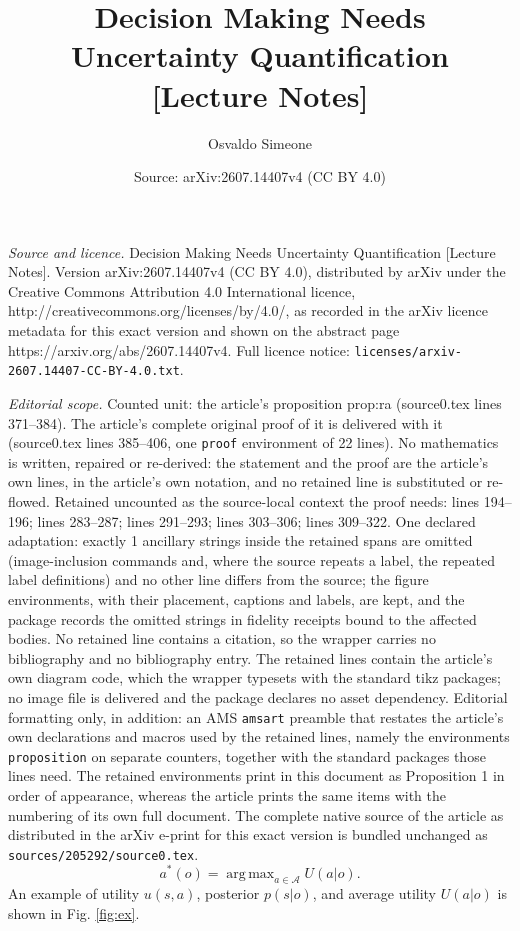 \documentclass[10pt,a4paper]{amsart}
\title{Decision Making Needs Uncertainty Quantification [Lecture Notes]}
\author{Osvaldo Simeone}
\date{Source: arXiv:2607.14407v4 (CC BY 4.0)}
\newcommand{\Aset}{\mathcal{A}}
\DeclareMathOperator*{\argmax}{arg\,max}
\begin{document}
\maketitle

\noindent\emph{Source and licence.} Decision Making Needs Uncertainty Quantification [Lecture Notes]. Version arXiv:2607.14407v4 (CC BY 4.0), distributed by arXiv under the Creative Commons Attribution 4.0 International licence, http://creativecommons.org/licenses/by/4.0/, as recorded in the arXiv licence metadata for this exact version and shown on the abstract page https://arxiv.org/abs/2607.14407v4. Full licence notice: \texttt{licenses/arxiv-2607.14407-CC-BY-4.0.txt}.\par\smallskip

\noindent\textit{Editorial scope.} Counted unit: the article's proposition prop:ra (source0.tex lines 371--384). The article's complete original proof of it is delivered with it (source0.tex lines 385--406, one \texttt{proof} environment of 22 lines). No mathematics is written, repaired or re-derived: the statement and the proof are the article's own lines, in the article's own notation, and no retained line is substituted or re-flowed.  Retained uncounted as the source-local context the proof needs: lines 194--196; lines 283--287; lines 291--293; lines 303--306; lines 309--322.  One declared adaptation: exactly 1 ancillary strings inside the retained spans are omitted (image-inclusion commands and, where the source repeats a label, the repeated label definitions) and no other line differs from the source; the figure environments, with their placement, captions and labels, are kept, and the package records the omitted strings in fidelity receipts bound to the affected bodies.  No retained line contains a citation, so the wrapper carries no bibliography and no bibliography entry.  The retained lines contain the article's own diagram code, which the wrapper typesets with the standard tikz packages; no image file is delivered and the package declares no asset dependency.  Editorial formatting only, in addition: an AMS \texttt{amsart} preamble that restates the article's own declarations and macros used by the retained lines, namely the environments \texttt{proposition} on separate counters, together with the standard packages those lines need.  The retained environments print in this document as Proposition 1 in order of appearance, whereas the article prints the same items with the numbering of its own full document.  The complete native source of the article as distributed in the arXiv e-print for this exact version is bundled unchanged as \texttt{sources/205292/source0.tex}.
\begin{equation}\label{eq:optaction}
a^*(o)=\argmax_{a \in \Aset} U(a| o).
\end{equation} An example of utility $u(s,a)$, posterior $p(s|o)$, and average utility $U(a|o)$ is shown in Fig. \ref{fig:ex}.
\end{document}
